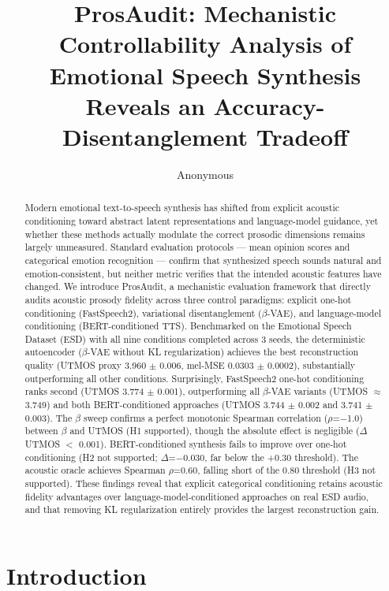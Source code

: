 \documentclass{article}
\title{ProsAudit: Mechanistic Controllability Analysis of Emotional Speech Synthesis Reveals an Accuracy-Disentanglement Tradeoff}
\author{Anonymous}
\begin{document}
\maketitle

\begin{abstract}
Modern emotional text-to-speech synthesis has shifted from explicit acoustic conditioning toward abstract latent representations and language-model guidance, yet whether these methods actually modulate the correct prosodic dimensions remains largely unmeasured. Standard evaluation protocols --- mean opinion scores and categorical emotion recognition --- confirm that synthesized speech sounds natural and emotion-consistent, but neither metric verifies that the intended acoustic features have changed. We introduce ProsAudit, a mechanistic evaluation framework that directly audits acoustic prosody fidelity across three control paradigms: explicit one-hot conditioning (FastSpeech2), variational disentanglement ($\beta$-VAE), and language-model conditioning (BERT-conditioned TTS). Benchmarked on the Emotional Speech Dataset (ESD) with all nine conditions completed across 3 seeds, the deterministic autoencoder ($\beta$-VAE without KL regularization) achieves the best reconstruction quality (UTMOS proxy 3.960 $\pm$ 0.006, mel-MSE 0.0303 $\pm$ 0.0002), substantially outperforming all other conditions. Surprisingly, FastSpeech2 one-hot conditioning ranks second (UTMOS 3.774 $\pm$ 0.001), outperforming all $\beta$-VAE variants (UTMOS $\approx$ 3.749) and both BERT-conditioned approaches (UTMOS 3.744 $\pm$ 0.002 and 3.741 $\pm$ 0.003). The $\beta$ sweep confirms a perfect monotonic Spearman correlation ($\rho$=$-$1.0) between $\beta$ and UTMOS (H1 supported), though the absolute effect is negligible ($\Delta$UTMOS $<$ 0.001). BERT-conditioned synthesis fails to improve over one-hot conditioning (H2 not supported; $\Delta$=$-$0.030, far below the +0.30 threshold). The acoustic oracle achieves Spearman $\rho$=0.60, falling short of the 0.80 threshold (H3 not supported). These findings reveal that explicit categorical conditioning retains acoustic fidelity advantages over language-model-conditioned approaches on real ESD audio, and that removing KL regularization entirely provides the largest reconstruction gain.
\end{abstract}

\section{Introduction}
\end{document}
